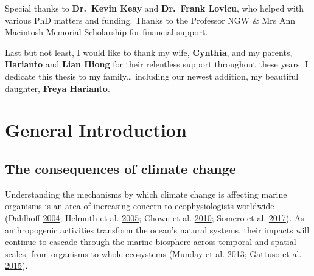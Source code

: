 \documentclass[a4paper,10pt, oneside]{memoir}
\begin{document}
Special thanks to \textbf{Dr.~Kevin Keay} and \textbf{Dr.~Frank Lovicu}, who helped with various PhD matters and funding. Thanks to the Professor NGW \& Mrs Ann Macintosh Memorial Scholarship for financial support.

Last but not least, I would like to thank my wife, \textbf{Cynthia}, and my parents, \textbf{Harianto} and \textbf{Lian Hiong} for their relentless support throughout these years. I dedicate this thesis to my family\ldots{} including our newest addition, my beautiful daughter, \textbf{Freya Harianto}.

\cleardoublepage

\hypersetup{linkcolor=black}
\SingleSpacing
\tableofcontents
\clearpage
\listoffigures
\clearpage
\listoftables
\cleardoublepage


\OnehalfSpacing

\mainmatter

\hypertarget{intro}{%
\chapter{General Introduction}\label{intro}}

\hypertarget{the-consequences-of-climate-change}{%
\section{The consequences of climate change}\label{the-consequences-of-climate-change}}

Understanding the mechanisms by which climate change is affecting marine organisms is an area of increasing concern to ecophysiologists worldwide (Dahlhoff \protect\hyperlink{ref-Dahlhoff2004}{2004}; Helmuth et al. \protect\hyperlink{ref-Helmuth2005}{2005}; Chown et al. \protect\hyperlink{ref-Chown2010}{2010}; Somero et al. \protect\hyperlink{ref-Somero2017}{2017}).
As anthropogenic activities transform the ocean's natural systems, their impacts will continue to cascade through the marine biosphere across temporal and spatial scales, from organisms to whole ecosystems (Munday et al. \protect\hyperlink{ref-Munday2013}{2013}; Gattuso et al. \protect\hyperlink{ref-Gattuso2015}{2015}).
\end{document}
